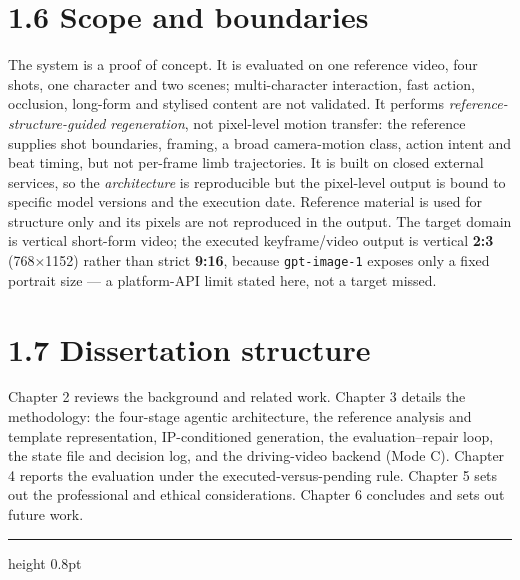 \documentclass[10pt,twocolumn,letterpaper]{article}
\begin{document}

\section*{1.6 Scope and boundaries}

The system is a proof of concept. It is evaluated on one reference video, four shots, one character and two scenes; multi-character interaction, fast action, occlusion, long-form and stylised content are not validated. It performs \emph{reference-structure-guided regeneration}, not pixel-level motion transfer: the reference supplies shot boundaries, framing, a broad camera-motion class, action intent and beat timing, but not per-frame limb trajectories. It is built on closed external services, so the \emph{architecture} is reproducible but the pixel-level output is bound to specific model versions and the execution date. Reference material is used for structure only and its pixels are not reproduced in the output. The target domain is vertical short-form video; the executed keyframe/video output is vertical \textbf{2:3} (768$\times$1152) rather than strict \textbf{9:16}, because \texttt{gpt-image-1} exposes only a fixed portrait size --- a platform-API limit stated here, not a target missed.


\section*{1.7 Dissertation structure}

Chapter 2 reviews the background and related work. Chapter 3 details the methodology: the four-stage agentic architecture, the reference analysis and template representation, IP-conditioned generation, the evaluation--repair loop, the state file and decision log, and the driving-video backend (Mode C). Chapter 4 reports the evaluation under the executed-versus-pending rule. Chapter 5 sets out the professional and ethical considerations. Chapter 6 concludes and sets out future work.

\par\vspace{22pt}

\vspace*{2pt}\vspace{3pt}\hrule height 0.8pt\vspace{12pt}
\end{document}
